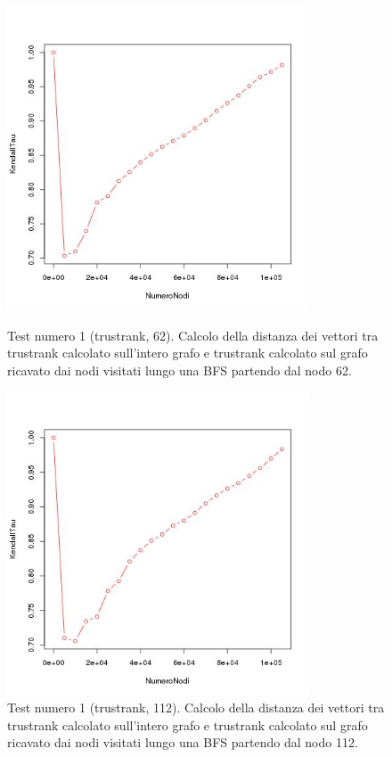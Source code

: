  \begin{figure}
\centering
 \includegraphics[height=9cm]{immagini/test1/trustranktestMode1_62}
 \caption{Test numero 1 (trustrank, 62). Calcolo della distanza dei vettori tra trustrank calcolato sull'intero grafo e trustrank calcolato sul grafo ricavato dai nodi visitati lungo una BFS partendo dal nodo 62.}
 \label{fig:test1trustModoB62}
\centering
 \includegraphics[height=9cm]{immagini/test1/trustranktestMode1_112}
 \caption{Test numero 1 (trustrank, 112). Calcolo della distanza dei vettori tra trustrank calcolato sull'intero grafo e trustrank calcolato sul grafo ricavato dai nodi visitati lungo una BFS partendo dal nodo 112.}
 \label{fig:test1trustModoB112}
\end{figure}

